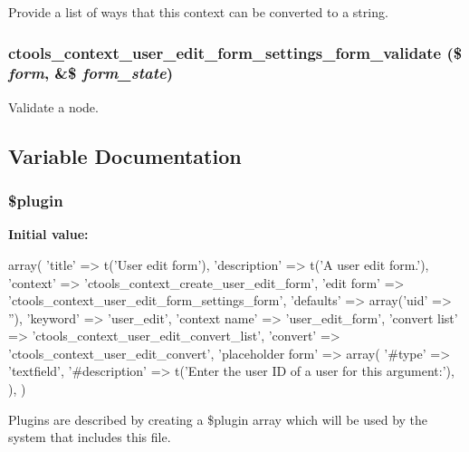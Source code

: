 \label{user__edit__form_8inc_a961f6f629f3ba7c8ac2ba09b098f436c}
Provide a list of ways that this context can be converted to a string. \hypertarget{user__edit__form_8inc_ac3bf848949d1f5d7913b27bb53c26c0c}{
\subsubsection[{ctools\_\-context\_\-user\_\-edit\_\-form\_\-settings\_\-form\_\-validate}]{\setlength{\rightskip}{0pt plus 5cm}ctools\_\-context\_\-user\_\-edit\_\-form\_\-settings\_\-form\_\-validate (\$ {\em form}, \/  \&\$ {\em form\_\-state})}}
\label{user__edit__form_8inc_ac3bf848949d1f5d7913b27bb53c26c0c}
Validate a node. 

\subsection{Variable Documentation}
\hypertarget{user__edit__form_8inc_ada8a7130088351710bb02ed622d6bf65}{
\subsubsection[{\$plugin}]{\setlength{\rightskip}{0pt plus 5cm}\$plugin}}
\label{user__edit__form_8inc_ada8a7130088351710bb02ed622d6bf65}
{\bfseries Initial value:}
\begin{DoxyCode}
 array(
  'title' => t('User edit form'),
  'description' => t('A user edit form.'),
  'context' => 'ctools_context_create_user_edit_form',
  'edit form' => 'ctools_context_user_edit_form_settings_form',
  'defaults' => array('uid' => ''),
  'keyword' => 'user_edit',
  'context name' => 'user_edit_form',
  'convert list' => 'ctools_context_user_edit_convert_list',
  'convert' => 'ctools_context_user_edit_convert',
  'placeholder form' => array(
    '#type' => 'textfield',
    '#description' => t('Enter the user ID of a user for this argument:'),
  ),
)
\end{DoxyCode}
Plugins are described by creating a \$plugin array which will be used by the system that includes this file. 